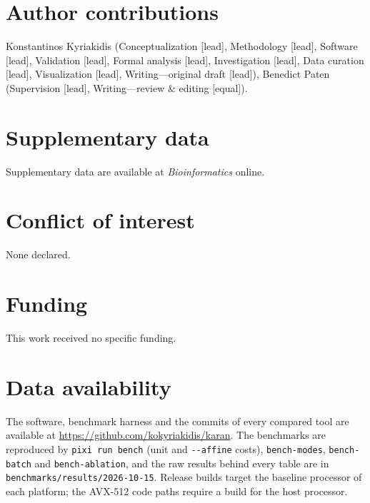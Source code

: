 \section*{Author contributions}
Konstantinos Kyriakidis (Conceptualization [lead], Methodology [lead], Software [lead], Validation [lead], Formal analysis [lead], Investigation [lead], Data curation [lead], Visualization [lead], Writing—original draft [lead]), Benedict Paten (Supervision [lead], Writing—review \& editing [equal]).

\section*{Supplementary data}
Supplementary data are available at \emph{Bioinformatics} online.

\section*{Conflict of interest}
None declared.

\section*{Funding}
This work received no specific funding.

\section*{Data availability}
The software, benchmark harness and the commits of every compared tool are available at \url{https://github.com/kokyriakidis/karan}. The benchmarks are reproduced by \texttt{pixi run bench} (unit and \texttt{-{}-affine} costs), \texttt{bench-modes}, \texttt{bench-batch} and \texttt{bench-ablation}, and the raw results behind every table are in \texttt{benchmarks/results/2026-10-15}. Release builds target the baseline processor of each platform; the AVX-512 code paths require a build for the host processor.
